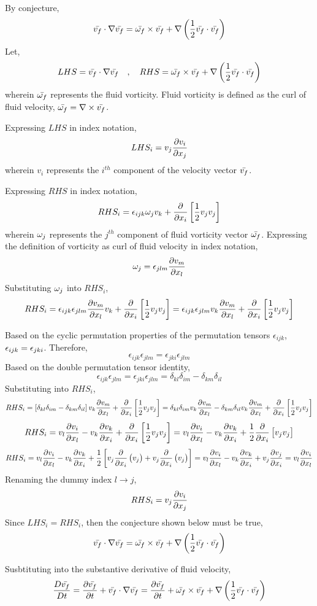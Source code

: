 \documentclass[a4paper, 12pt]{report}
\begin{document}
\begin{center}
By conjecture,
$$\bar{v_f}\cdot\nabla\bar{v_f} = \bar{\omega_f}\times \bar{v_f} + \nabla\left(\frac{1}{2}\bar{v_f}\cdot\bar{v_f}\right)$$
Let,
$$LHS = \bar{v_f}\cdot\nabla\bar{v_f} \quad,\quad RHS = \bar{\omega_f}\times \bar{v_f} + \nabla\left(\frac{1}{2}\bar{v_f}\cdot\bar{v_f}\right)$$
wherein $\bar{\omega_f}$ represents the fluid vorticity. Fluid vorticity is defined as the curl of fluid velocity, $\displaystyle \bar{\omega_f} = \nabla\times \bar{v_f}$.

Expressing $LHS$ in index notation,
$$LHS_i = v_j\frac{\partial v_i}{\partial x_j}$$
wherein $v_i$ represents the $i^{th}$ component of the velocity vector $\bar{v_f}$. 

Expressing $RHS$ in index notation,
$$RHS_i = \epsilon_{ijk} \omega_j v_k + \frac{\partial}{\partial x_i}\left[\frac{1}{2}v_jv_j\right]$$
wherein $\omega_j$ represents the $j^{th}$ component of fluid vorticity vector $\bar{\omega_f}$. Expressing the definition of vorticity as curl of fluid velocity in index notation,
$$\omega_j = \epsilon_{jlm}\frac{\partial v_m}{\partial x_l}$$
Substituting $\omega_j$ into $RHS_i$,
$$RHS_i = \epsilon_{ijk} \epsilon_{jlm}\frac{\partial v_m}{\partial x_l} v_k + \frac{\partial}{\partial x_i}\left[\frac{1}{2}v_jv_j\right] = \epsilon_{ijk} \epsilon_{jlm} v_k\frac{\partial v_m}{\partial x_l} + \frac{\partial}{\partial x_i}\left[\frac{1}{2}v_jv_j\right]$$

Based on the cyclic permutation properties of the permutation tensors $\epsilon_{ijk}$, $\displaystyle \epsilon_{ijk} = \epsilon_{jki}$. Therefore,
$$\epsilon_{ijk} \epsilon_{jlm} = \epsilon_{jki} \epsilon_{jlm}$$
Based on the double permutation tensor identity,
$$\epsilon_{ijk} \epsilon_{jlm} = \epsilon_{jki} \epsilon_{jlm} = \delta_{kl}\delta_{im} - \delta_{km}\delta_{il}$$
Substituting into $RHS_i$,
$$RHS_i = \left[\delta_{kl}\delta_{im} - \delta_{km}\delta_{il}\right]v_k\frac{\partial v_m}{\partial x_l} + \frac{\partial}{\partial x_i}\left[\frac{1}{2}v_jv_j\right] = \delta_{kl}\delta_{im}v_k\frac{\partial v_m}{\partial x_l} - \delta_{km}\delta_{il}v_k\frac{\partial v_m}{\partial x_l} + \frac{\partial}{\partial x_i}\left[\frac{1}{2}v_jv_j\right]$$
$$RHS_i = v_l\frac{\partial v_i}{\partial x_l} - v_k\frac{\partial v_k}{\partial x_i} + \frac{\partial}{\partial x_i}\left[\frac{1}{2}v_jv_j\right] = v_l\frac{\partial v_i}{\partial x_l} - v_k\frac{\partial v_k}{\partial x_i} + \frac{1}{2}\frac{\partial}{\partial x_i}\left[v_jv_j\right]$$
$$RHS_i = v_l\frac{\partial v_i}{\partial x_l} - v_k\frac{\partial v_k}{\partial x_i} + \frac{1}{2}\left[v_j\frac{\partial}{\partial x_i}\left(v_j\right) + v_j\frac{\partial}{\partial x_i}\left(v_j\right)\right] = v_l\frac{\partial v_i}{\partial x_l} - v_k\frac{\partial v_k}{\partial x_i} + v_j\frac{\partial v_j}{\partial x_i} = v_l\frac{\partial v_i}{\partial x_l}$$
Renaming the dummy index $l\to j$,
$$RHS_i = v_j\frac{\partial v_i}{\partial x_j}$$
Since $LHS_i = RHS_i$, then the conjecture shown below must be true,
$$\bar{v_f}\cdot\nabla\bar{v_f} = \bar{\omega_f}\times \bar{v_f} + \nabla\left(\frac{1}{2}\bar{v_f}\cdot\bar{v_f}\right)$$


Susbtituting into the substantive derivative of fluid velocity,
$$\frac{D \bar{v_f}}{Dt} = \frac{\partial \bar{v_f}}{\partial t} + \bar{v_f}\cdot\nabla\bar{v_f} = \frac{\partial \bar{v_f}}{\partial t} + \bar{\omega_f}\times \bar{v_f} + \nabla\left(\frac{1}{2}\bar{v_f}\cdot\bar{v_f}\right)$$


\end{center}
\end{document}
